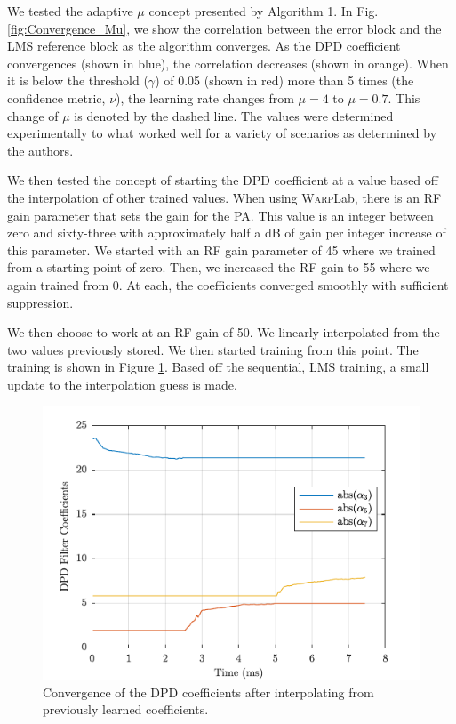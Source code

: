 We tested the adaptive $\mu$ concept presented by Algorithm 1. 
In Fig. \ref{fig:Convergence_Mu}, we show the correlation between the error block and the LMS reference block as the algorithm converges. 
As the DPD coefficient convergences (shown in blue), the correlation decreases (shown in orange). 
When it is below the threshold ($\gamma$) of 0.05 (shown in red) more than 5 times (the confidence metric, $\nu$), the learning rate changes from $\mu = 4$ to $\mu = 0.7$. 
This change of $\mu$ is denoted by the dashed line. 
The values were determined experimentally to what worked well for a variety of scenarios as determined by the authors. 

We then tested the concept of starting the DPD coefficient at a value based off the interpolation of other trained values. 
When using \textsc{Warp}Lab, there is an RF gain parameter that sets the gain for the PA. This value is an integer between zero and sixty-three with approximately half a dB of gain per integer increase of this parameter. We started with an RF gain parameter of 45 where we trained from a starting point of zero. Then, we increased the RF gain to 55 where we again trained from 0. At each, the coefficients converged smoothly with sufficient suppression. 

We then choose to work at an RF gain of 50. We linearly interpolated from the two values previously stored. We then started training from this point. The training is shown in Figure \ref{fig:Interpolate}. Based off the sequential, LMS training, a small update to the interpolation guess is made. 

\begin{figure}[t!] 
	\centering
	\includegraphics[]{Interpolate} 
	\caption{Convergence of the DPD coefficients after interpolating from previously learned coefficients.}
	\label{fig:Interpolate}
\end{figure}

